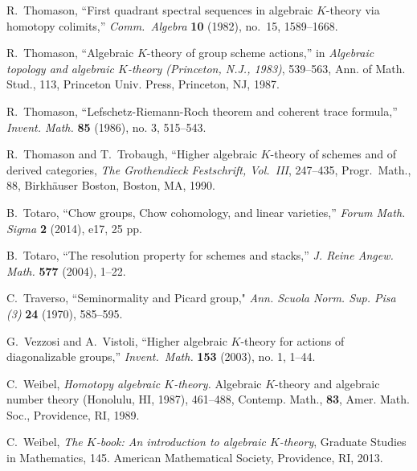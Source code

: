 \documentclass[11pt]{amsart}
\theoremstyle{definition}
\begin{document}
\begin{thebibliography}{CHWW}
 R.~Thomason, ``First quadrant spectral sequences in algebraic $K$-theory via homotopy colimits,'' {\em Comm.~Algebra} {\bf 10} (1982), no.~15, 1589--1668.

 R.~Thomason, ``Algebraic $K$-theory of group scheme actions,'' in {\em Algebraic topology and algebraic $K$-theory (Princeton, N.J., 1983)}, 539--563, Ann. of Math. Stud., 113, Princeton Univ. Press, Princeton, NJ, 1987.

 R.~Thomason, ``Lefschetz-Riemann-Roch theorem and coherent trace formula,'' {\em Invent. Math.} {\bf 85} (1986), no. 3, 515--543.

 R.~Thomason and T.~Trobaugh, ``Higher algebraic $K$-theory of schemes and of derived categories, {\em The Grothendieck Festschrift, Vol.~III}, 247--435, Progr.~Math., 88, Birkh\"auser Boston, Boston, MA, 1990.

 B.~Totaro, ``Chow groups, Chow cohomology, and linear varieties,'' {\em Forum Math. Sigma} {\bf 2} (2014), e17, 25 pp.

 B.~Totaro, ``The resolution property for schemes and stacks,''  {\em J. Reine Angew. Math.}  {\bf 577} (2004), 1--22.

 C.~Traverso, ``Seminormality and Picard group," {\em Ann. Scuola Norm. Sup. Pisa (3)} {\bf 24} (1970), 585--595. 

 G.~Vezzosi and A.~Vistoli, ``Higher algebraic $K$-theory for actions of diagonalizable groups,'' {\em Invent.~Math.} {\bf 153} (2003), no. 1, 1--44.

  C.~Weibel, \emph{Homotopy algebraic $K$-theory.} Algebraic $K$-theory and algebraic number theory (Honolulu, HI, 1987), 461--488,
Contemp. Math., {\bf 83}, Amer. Math. Soc., Providence, RI, 1989.

 C.~Weibel, {\em The $K$-book: An introduction to algebraic $K$-theory}, Graduate Studies in Mathematics, 145. American Mathematical Society, Providence, RI, 2013.

\end{thebibliography}
\end{document}
